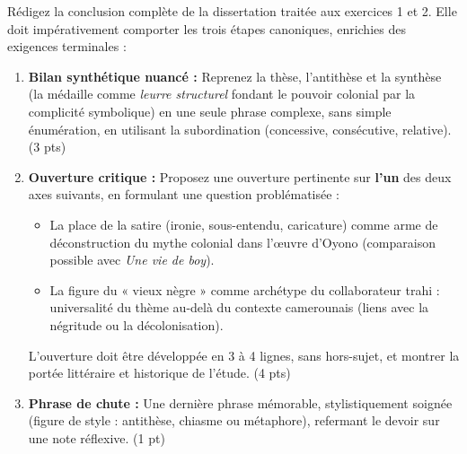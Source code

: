\documentclass[11pt]{article}
\begin{document}
\begin{exercice}
Rédigez la conclusion complète de la dissertation traitée aux exercices 1 et 2. Elle doit impérativement comporter les trois étapes canoniques, enrichies des exigences terminales :

\begin{enumerate}
    \item \textbf{Bilan synthétique nuancé :} Reprenez la thèse, l'antithèse et la synthèse (la médaille comme \textit{leurre structurel} fondant le pouvoir colonial par la complicité symbolique) en une seule phrase complexe, sans simple énumération, en utilisant la subordination (concessive, consécutive, relative). (3 pts)
    \item \textbf{Ouverture critique :} Proposez une ouverture pertinente sur \textbf{l'un} des deux axes suivants, en formulant une question problématisée :
    \begin{itemize}
        \item[Axe A :] La place de la satire (ironie, sous-entendu, caricature) comme arme de déconstruction du mythe colonial dans l'œuvre d'Oyono (comparaison possible avec \textit{Une vie de boy}).
        \item[Axe B :] La figure du « vieux nègre » comme archétype du collaborateur trahi : universalité du thème au-delà du contexte camerounais (liens avec la négritude ou la décolonisation).
    \end{itemize}
    L'ouverture doit être développée en 3 à 4 lignes, sans hors-sujet, et montrer la portée littéraire et historique de l'étude. (4 pts)
    \item \textbf{Phrase de chute :} Une dernière phrase mémorable, stylistiquement soignée (figure de style : antithèse, chiasme ou métaphore), refermant le devoir sur une note réflexive. (1 pt)
\end{enumerate}
\end{exercice}
\end{document}
